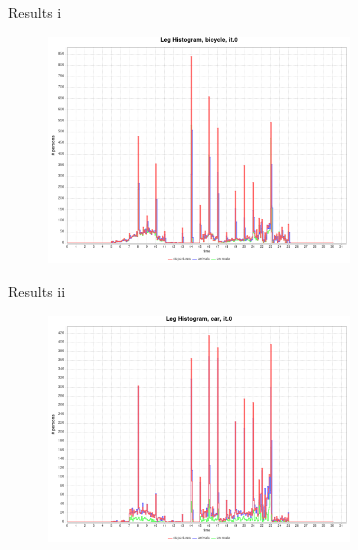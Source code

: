 \documentclass[10pt, aspectratio=169]{beamer}
\begin{document}
    \begin{frame}{Results i}
        \begin{center}
            \begin{figure}
                \centering
                \includegraphics[height=6cm, keepaspectratio]{images/build_city/results/0.legHistogram_bicycle.png}
            \end{figure}
        \end{center}
    \end{frame}
    
    \begin{frame}{Results ii}
        \begin{center}
            \begin{figure}
                \centering
                \includegraphics[height=6cm, keepaspectratio]{images/build_city/results/0.legHistogram_car.png}
            \end{figure}
        \end{center}
    \end{frame}
    
\end{document}
